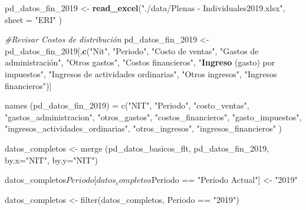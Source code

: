 \documentclass[
  11pt,
]{article}
\newenvironment{Shaded}{\begin{snugshade}}{\end{snugshade}}
\newcommand{\CommentTok}[1]{\textcolor[rgb]{0.56,0.35,0.01}{\textit{#1}}}
\newcommand{\DataTypeTok}[1]{\textcolor[rgb]{0.13,0.29,0.53}{#1}}
\newcommand{\DecValTok}[1]{\textcolor[rgb]{0.00,0.00,0.81}{#1}}
\newcommand{\KeywordTok}[1]{\textcolor[rgb]{0.13,0.29,0.53}{\textbf{#1}}}
\newcommand{\NormalTok}[1]{#1}
\newcommand{\StringTok}[1]{\textcolor[rgb]{0.31,0.60,0.02}{#1}}
\begin{document}
\begin{Shaded}
\begin{Highlighting}[]
\NormalTok{pd_datos_fin_}\DecValTok{2019}\NormalTok{ <-}\StringTok{ }\KeywordTok{read_excel}\NormalTok{(}\StringTok{"./data/Plenas - Individuales2019.xlsx"}\NormalTok{, }\DataTypeTok{sheet =} \StringTok{"ERI"}\NormalTok{ )}

\CommentTok{#Revisar Costos de distribución}
\NormalTok{pd_datos_fin_}\DecValTok{2019}\NormalTok{ <-}\StringTok{ }\NormalTok{pd_datos_fin_}\DecValTok{2019}\NormalTok{[,}\KeywordTok{c}\NormalTok{(}\StringTok{"Nit"}\NormalTok{, }\StringTok{"Periodo"}\NormalTok{, }\StringTok{"Costo de ventas"}\NormalTok{, }\StringTok{"Gastos de administración", "}\NormalTok{Otros gastos}\StringTok{", "}\NormalTok{Costos financieros}\StringTok{", "}\KeywordTok{Ingreso}\NormalTok{ (gasto) por impuestos}\StringTok{", "}\NormalTok{Ingresos de actividades ordinarias}\StringTok{", "}\NormalTok{Otros ingresos}\StringTok{", "}\NormalTok{Ingresos financieros}\StringTok{")]}

\StringTok{names (pd_datos_fin_2019) = c("}\NormalTok{NIT}\StringTok{", "}\NormalTok{Periodo}\StringTok{", "}\NormalTok{costo_ventas}\StringTok{", "}\NormalTok{gastos_administracion}\StringTok{", "}\NormalTok{otros_gastos}\StringTok{", "}\NormalTok{costos_financieros}\StringTok{", "}\NormalTok{gasto_impuestos}\StringTok{", "}\NormalTok{ingresos_actividades_ordinarias}\StringTok{", "}\NormalTok{otros_ingresos}\StringTok{", "}\NormalTok{ingresos_financieros}\StringTok{" )}

\StringTok{datos_completos <- merge (pd_datos_basicos_flt, pd_datos_fin_2019, by.x="}\NormalTok{NIT}\StringTok{", by.y="}\NormalTok{NIT}\StringTok{")}

\StringTok{datos_completos$Periodo[datos_completos$Periodo == "}\NormalTok{Periodo Actual}\StringTok{"] <- "}\DecValTok{2019}\StringTok{"}

\StringTok{datos_completos <- filter(datos_completos, Periodo == "}\DecValTok{2019}\StringTok{")}
\end{Highlighting}
\end{Shaded}
\end{document}
